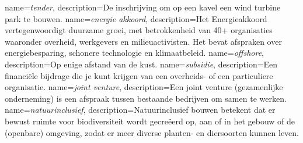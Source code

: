 \printglossaries
{}
{
    name=\textit{tender},
    description={De inschrijving om op een kavel een wind turbine park te bouwen.}
}
{
    name=\textit{energie akkoord},
    description={Het Energieakkoord vertegenwoordigt duurzame groei, met betrokkenheid van 40+ organisaties waaronder overheid, werkgevers en milieuactivisten. Het bevat afspraken over energiebesparing, schonere technologie en klimaatbeleid.}
}
{
    name=\textit{offshore},
    description={Op enige afstand van de kust.}
}
{
    name=\textit{subsidie},
    description={Een financiële bijdrage die je kunt krijgen van een overheids- of een particuliere organisatie.}
}
{
    name=\textit{joint venture},
    description={Een joint venture (gezamenlijke onderneming) is een afspraak tussen bestaande bedrijven om samen te werken.}
}
{
    name=\textit{natuurinclusief},
    description={Natuurinclusief bouwen betekent dat er bewust ruimte voor biodiversiteit wordt gecreëerd op, aan of in het gebouw of de (openbare) omgeving, zodat er meer diverse planten- en diersoorten kunnen leven.}
}